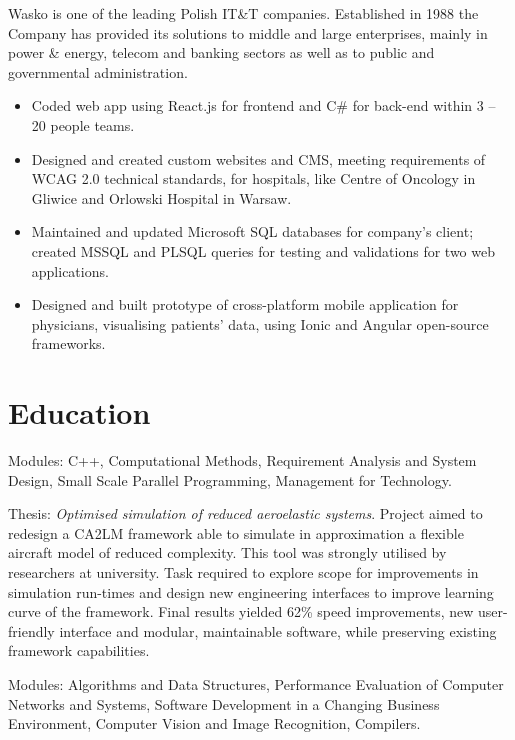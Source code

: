 \documentclass[12pt,english]{resume}
\begin{document}
		Wasko is one of the leading Polish IT\&T companies. Established in 1988 the Company has provided its solutions to middle and large enterprises, mainly in power \& energy, telecom and banking sectors as well as to public and governmental administration.
		\begin{itemize}
			\item Coded web app using React.js for frontend and C\# for back-end within 3 – 20 people teams.
			\item Designed and created custom websites and CMS, meeting requirements of WCAG 2.0 technical standards, for hospitals, like Centre of Oncology in Gliwice and Orlowski Hospital in Warsaw.
			\item Maintained and updated Microsoft SQL databases for company’s client; created MSSQL and PLSQL queries for testing and validations for two web applications.
			\item Designed and built prototype of cross-platform mobile application for physicians, visualising patients’ data, using Ionic and Angular open-source frameworks.
		\end{itemize}
	
	\section{Education}

			Modules: C++, Computational Methods, Requirement Analysis and System Design, Small Scale Parallel Programming, Management for Technology.

			\noindent
			Thesis: \emph{Optimised simulation of reduced aeroelastic systems}.
			Project aimed to redesign a CA2LM framework able to simulate in approximation a flexible aircraft model of reduced complexity. This tool was strongly utilised by researchers at university. Task required to explore scope for improvements in simulation run-times and design new engineering interfaces to improve learning curve of the framework. Final results yielded 62\% speed improvements, new user-friendly interface and modular, maintainable software, while preserving existing framework capabilities.

			Modules: Algorithms and Data Structures, Performance Evaluation of Computer Networks and Systems, Software Development in a Changing Business Environment, Computer Vision and Image Recognition, Compilers.
\end{document}
